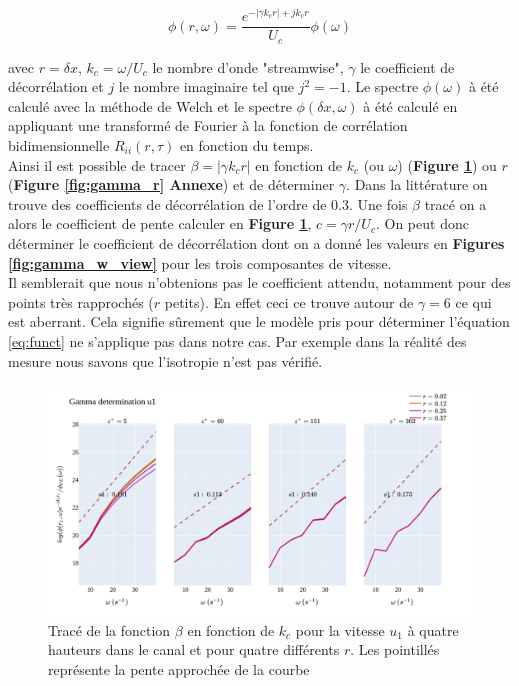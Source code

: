 \documentclass[12pt]{article}
\theoremstyle{plain}
\theoremstyle{remark}
\begin{document}
\begin{equation}
	\phi(r, \omega) = \frac{e^{-|\gamma k_c r| + jk_cr}}{U_c}\phi(\omega)
	\label{eq:funct}
\end{equation} 

avec $r = \delta x$, $k_c=\omega/U_c$ le nombre d'onde "streamwise", $\gamma$ le coefficient de décorrélation et $j$ le nombre imaginaire tel que $j^2=-1$. Le spectre $\phi(\omega)$ à été calculé avec la méthode de Welch et le spectre $\phi(\delta x, \omega)$ à été calculé en appliquant une transformé de Fourier à la fonction de corrélation bidimensionnelle $R_{ii}(r,\tau)$ en fonction du temps.\\
Ainsi il est possible de tracer $\beta = |\gamma k_c r|$ en fonction de $k_c$ (ou $\omega$) ({\bf Figure \ref{fig:gamma_w}}) ou $r$ ({\bf Figure \ref{fig:gamma_r} Annexe}) et de déterminer $\gamma$. Dans la littérature on trouve des coefficients de décorrélation de l'ordre de $0.3$. Une fois $\beta$ tracé on a alors le coefficient de pente calculer en {\bf Figure \ref{fig:gamma_w}}, $c=\gamma r / U_c$. On peut donc déterminer le coefficient de décorrélation dont on a donné les valeurs en {\bf Figures \ref{fig:gamma_w_view}} pour les trois composantes de vitesse. \\
Il semblerait que nous n'obtenions pas le coefficient attendu, notamment pour des points très rapprochés ($r$ petits). En effet ceci ce trouve autour de $\gamma = 6$ ce qui est aberrant. Cela signifie sûrement que le modèle pris pour déterminer l'équation \ref{eq:funct} ne s'applique pas dans notre cas. Par exemple dans la réalité des mesure nous savons que l'isotropie n'est pas vérifié.



\begin{figure}[H]
	\begin{center}
		\includegraphics[width=0.9\linewidth]{../../output/figures/channel_wrles_retau395/split_time/gamma/gamma_u1_w.png}
		\caption{Tracé de la fonction $\beta$ en fonction de $k_c$ pour la vitesse $u_1$ à quatre hauteurs dans le canal et pour quatre différents $r$. Les pointillés représente la pente approchée de la courbe}
		\label{fig:gamma_w}
	\end{center}
\end{figure}
\end{document}
